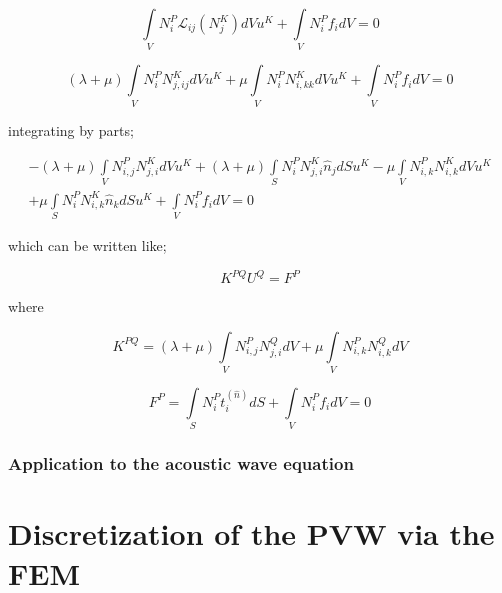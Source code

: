 \[\int\limits_V {N_i^P{\mathcal{L}_{ij}}(N_j^K)dV{u^K}}  + \int\limits_V {N_i^P{f_i}dV = 0} \]

\[(\lambda  + \mu )\int\limits_V {N_i^PN_{j,ij}^KdV{u^K}}  + \mu \int\limits_V {N_i^PN_{i,kk}^KdV{u^K}}  + \int\limits_V {N_i^P{f_i}dV = 0} \]

integrating by parts;

\begin{align*}
- (\lambda  + \mu )\int\limits_V {N_{i,j}^PN_{j,i}^KdV{u^K} + (\lambda  + \mu )\int\limits_S {N_i^PN_{j,i}^K{{\hat n}_j}dS{u^K} - \mu \int\limits_V {N_{i,k}^PN_{i,k}^KdV{u^K}} } } \\
+ \mu \int\limits_S {N_i^PN_{i,k}^K{{\hat n}_k}dS{u^K}}  + \int\limits_V {N_i^P{f_i}dV = 0}
\end{align*}

which can be written like;


\[{K^{PQ}}{U^Q} = {F^P}\]

where

\[{K^{PQ}} = (\lambda  + \mu )\int\limits_V {N_{i,j}^PN_{j,i}^QdV}  + \mu \int\limits_V {N_{i,k}^PN_{i,k}^QdV} \]

\[{F^P} = \int\limits_S {N_i^Pt_i^{(\hat n)}dS + \int\limits_V {N_i^P{f_i}dV = 0} } \]





\subsubsection*{Application to the acoustic wave equation}

\section[Discretization of the PVW using FEM]{Discretization of the PVW via the FEM}

